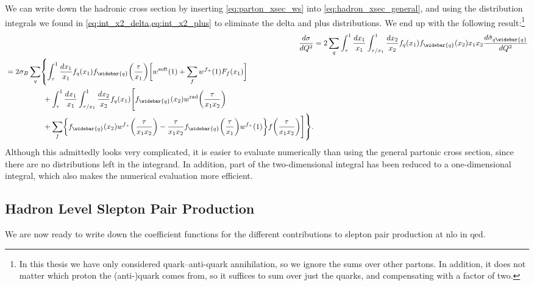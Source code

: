 We can write down the hadronic cross section by inserting \cref{eq:parton_xsec_ws} into \cref{eq:hadron_xsec_general}, and using the distribution integrals we found in \cref{eq:int_x2_delta,eq:int_x2_plus} to eliminate the delta and plus distributions.
We end up with the following result:\footnote{In this thesis we have only considered quark--anti-quark annihilation, so we ignore the sums over other partons. In addition, it does not matter which proton the (anti-)quark comes from, so it suffices to sum over just the quarks, and compensating with a factor of two.}
\begin{align}
    \frac{d\sigma}{dQ^2}
    &= 2 \sum_q \int_\tau^1 \frac{dx_1}{x_1} \int_{\tau/x_1}^1 \frac{dx_2}{x_2} f_q(x_1) f_{\widebar{q}}(x_2) x_1x_2 \frac{d\hat\sigma_{q\widebar{q}}}{dQ^2}
    \nonumber \\
    \begin{split}
        &= 2 \sigma_B \sum_q \vastl\{
            \int_\tau^1 \frac{dx_1}{x_1} f_q(x_1) f_{\widebar{q}}\biggl(\frac{\tau}{x_1}\biggr) \biggl[
                \wsoft(1) + \sum_f \wf(1) F_f(x_1)
            \biggr]
            \\ &\hspace{5em}
            + \int_\tau^1 \frac{dx_1}{x_1} \int_{\tau/x_1}^1 \frac{dx_2}{x_2} f_q(x_1) \Biggl[
                f_{\widebar{q}}(x_2) \wrad\biggl(\frac{\tau}{x_1 x_2}\biggr)
                \\ &\hspace{5em}
                + \sum_f \biggl\{
                    f_{\widebar{q}}(x_2) \wf\biggl(\frac{\tau}{x_1 x_2}\biggr)
                    - \frac{\tau}{x_1 x_2} f_{\widebar{q}}\biggl(\frac{\tau}{x_1}\biggr) \wf(1)
                \biggr\} f\biggl(\frac{\tau}{x_1 x_2}\biggr)
            \Biggr]
        \vastr\}.
        \label{eq:hadron_xsec_full_w}
    \end{split}
\end{align}
Although this admittedly looks very complicated, it is easier to evaluate numerically than using the general partonic cross section, since there are no distributions left in the integrand.
In addition, part of the two-dimensional integral has been reduced to a one-dimensional integral, which also makes the numerical evaluation more efficient.


\subsection{Hadron Level Slepton Pair Production}\label{sec:hadronic_cross_section}
We are now ready to write down the coefficient functions for the different contributions to slepton pair production at \gls{nlo} in \gls{qed}.

